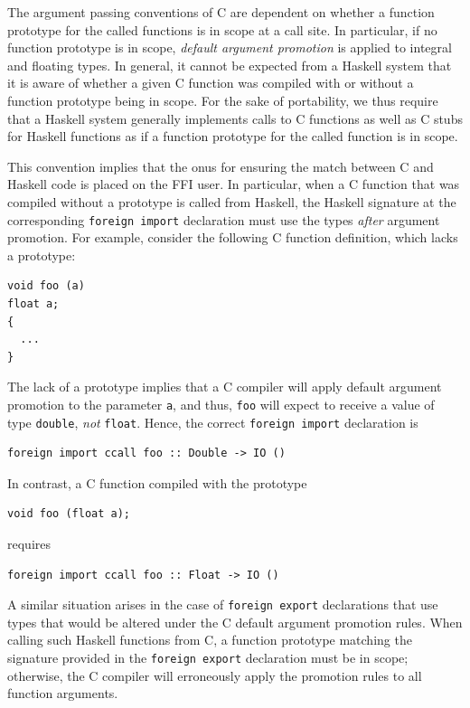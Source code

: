 The argument passing conventions of C are dependent on whether a function
prototype for the called functions is in scope at a call site.  In particular,
if no function prototype is in scope, \emph{default argument promotion} is
applied to integral and floating types.  In general, it cannot be expected
from a Haskell system that it is aware of whether a given C function was
compiled with or without a function prototype being in scope.  For the sake of
portability, we thus require that a Haskell system generally implements calls
to C functions as well as C stubs for Haskell functions as if a function
prototype for the called function is in scope.

This convention implies that the onus for ensuring the match between C and
Haskell code is placed on the FFI user.  In particular, when a C function that
was compiled without a prototype is called from Haskell, the Haskell signature
at the corresponding \mbox{\tt foreign\ import} declaration must use the types
\emph{after} argument promotion.  For example, consider the following C
function definition, which lacks a prototype:
%
\bprog
{\small\begin{verbatim}
void foo (a)
float a;
{
  ...
}
\end{verbatim}}
\eprog
%
The lack of a prototype implies that a C compiler will apply default argument
promotion to the parameter \mbox{\tt a}, and thus, \mbox{\tt foo} will expect to
receive a value of type \mbox{\tt double}, \emph{not} \mbox{\tt float}.  Hence, the
correct \mbox{\tt foreign\ import} declaration is
%
\bprog
{\small\begin{verbatim}
foreign import ccall foo :: Double -> IO ()
\end{verbatim}}
\eprog

In contrast, a C function compiled with the prototype
%
\bprog
{\small\begin{verbatim}
void foo (float a);
\end{verbatim}}
\eprog
%
requires
%
\bprog
{\small\begin{verbatim}
foreign import ccall foo :: Float -> IO ()
\end{verbatim}}
\eprog

A similar situation arises in the case of \mbox{\tt foreign\ export} declarations
that use types that would be altered under the C default argument promotion
rules.  When calling such Haskell functions from C, a function prototype
matching the signature provided in the \mbox{\tt foreign\ export} declaration must
be in scope; otherwise, the C compiler will erroneously apply the promotion
rules to all function arguments.

